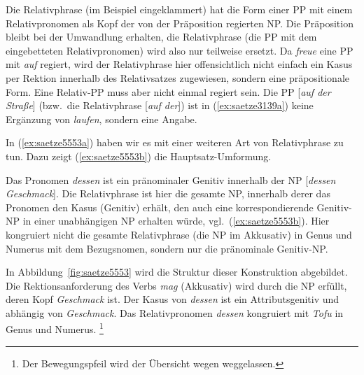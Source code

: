 Die Relativphrase (im Beispiel eingeklammert) hat die Form einer PP mit einem Relativpronomen als Kopf der von der Präposition regierten NP.
Die Präposition bleibt bei der Umwandlung erhalten, die Relativphrase (die PP mit dem eingebetteten Relativpronomen) wird also nur teilweise ersetzt.
Da \textit{freue} eine PP mit \textit{auf} regiert, wird der Relativphrase hier offensichtlich nicht einfach ein Kasus per Rektion innerhalb des Relativsatzes zugewiesen, sondern eine präpositionale Form.
Eine Relativ-PP muss aber nicht einmal regiert sein.
Die PP [\textit{auf der Straße}] (bzw.\ die Relativphrase [\textit{auf der}]) ist  in (\ref{ex:saetze3139a}) keine Ergänzung von \textit{laufen}, sondern eine Angabe.

\begin{exe}
  \ex\label{ex:saetze3139}
  \begin{xlist}
  \end{xlist}
\end{exe}

In (\ref{ex:saetze5553a}) haben wir es mit einer weiteren Art von Relativphrase zu tun.
Dazu zeigt (\ref{ex:saetze5553b}) die Hauptsatz-Umformung.

\begin{exe}
  \ex\label{ex:saetze5553} 
    \begin{xlist}
    \end{xlist}
\end{exe}

Das Pronomen \textit{dessen} ist ein pränominaler Genitiv innerhalb der NP [\textit{dessen Geschmack}].
Die Relativphrase ist hier die gesamte NP, innerhalb derer das Pronomen den Kasus (Genitiv) erhält, den auch eine korrespondierende Genitiv-NP in einer unabhängigen NP erhalten würde, vgl.\ (\ref{ex:saetze5553b}).
Hier kongruiert nicht die gesamte Relativphrase (die NP im Akkusativ) in Genus und Numerus mit dem Bezugsnomen, sondern nur die pränominale Genitiv-NP.


In Abbildung~\ref{fig:saetze5553} wird die Struktur dieser Konstruktion abgebildet.
Die Rektionsanforderung des Verbs \textit{mag} (Akkusativ) wird durch die NP erfüllt, deren Kopf \textit{Geschmack} ist.
Der Kasus von \textit{dessen} ist ein Attributsgenitiv und abhängig von \textit{Geschmack}.
Das Relativpronomen \textit{dessen} kongruiert mit \textit{Tofu} in Genus und Numerus.%
\footnote{Der Bewegungspfeil wird der Übersicht wegen weggelassen.}

